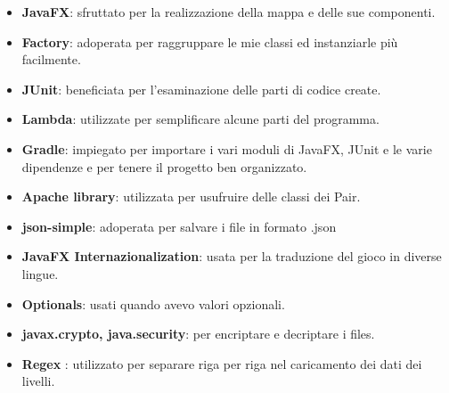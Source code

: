 \begin{itemize}
	\item \textsf{\small \textbf{JavaFX}: sfruttato per la realizzazione della mappa e delle sue componenti.}
	\item \textsf{\small \textbf{Factory}: adoperata per raggruppare le mie classi ed instanziarle più facilmente.}
	\item \textsf{\small \textbf{JUnit}: beneficiata per l'esaminazione delle parti di codice create.}
	\item \textsf{\small \textbf{Lambda}: utilizzate per semplificare alcune parti del programma.}
	\item \textsf{\small \textbf{Gradle}: impiegato per importare i vari moduli di JavaFX, JUnit e le varie dipendenze e per tenere il progetto ben organizzato.}
	\item \textsf{\small \textbf{Apache library}: utilizzata per usufruire delle classi dei Pair.}
	\item \textsf{\small \textbf{json-simple}: adoperata per salvare i file in formato .json}
	\item \textsf{\small \textbf{JavaFX Internazionalization}: usata per la traduzione del gioco in diverse lingue.}
	\item \textsf{\small \textbf{Optionals}: usati quando avevo valori opzionali.}
	\item \textsf{\small \textbf{javax.crypto, java.security}: per encriptare e decriptare i files.}
	\item \textsf{\small \textbf{Regex} : utilizzato per separare riga per riga nel caricamento dei dati dei livelli.}
\end{itemize}